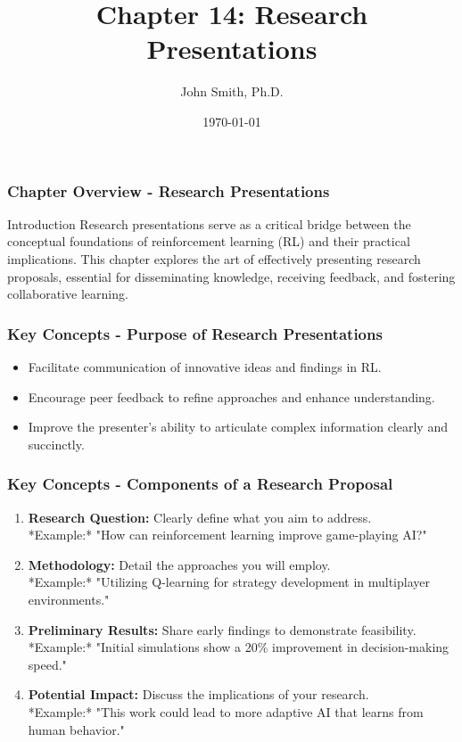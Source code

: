 \documentclass[aspectratio=169]{beamer}
\title[Research Presentations]{Chapter 14: Research Presentations}
\author[J. Smith]{John Smith, Ph.D.}
\institute[University Name]{
  Department of Computer Science\\
  University Name\\
  \vspace{0.3cm}
  Email: email@university.edu\\
  Website: www.university.edu
}
\date{\today}
\begin{document}
\frame{\titlepage}

\begin{frame}[fragile]
    \titlepage
\end{frame}

\begin{frame}[fragile]
    \frametitle{Chapter Overview - Research Presentations}
    \begin{block}{Introduction}
        Research presentations serve as a critical bridge between the conceptual foundations of reinforcement learning (RL) and their practical implications.
        This chapter explores the art of effectively presenting research proposals, essential for disseminating knowledge, receiving feedback, and fostering collaborative learning.
    \end{block}
\end{frame}

\begin{frame}[fragile]
    \frametitle{Key Concepts - Purpose of Research Presentations}
    \begin{itemize}
        \item Facilitate communication of innovative ideas and findings in RL.
        \item Encourage peer feedback to refine approaches and enhance understanding.
        \item Improve the presenter’s ability to articulate complex information clearly and succinctly.
    \end{itemize}
\end{frame}

\begin{frame}[fragile]
    \frametitle{Key Concepts - Components of a Research Proposal}
    \begin{enumerate}
        \item \textbf{Research Question:} Clearly define what you aim to address. \\
        *Example:* "How can reinforcement learning improve game-playing AI?"
        
        \item \textbf{Methodology:} Detail the approaches you will employ. \\
        *Example:* "Utilizing Q-learning for strategy development in multiplayer environments."
        
        \item \textbf{Preliminary Results:} Share early findings to demonstrate feasibility. \\
        *Example:* "Initial simulations show a 20\% improvement in decision-making speed."
        
        \item \textbf{Potential Impact:} Discuss the implications of your research. \\
        *Example:* "This work could lead to more adaptive AI that learns from human behavior."
    \end{enumerate}
\end{frame}
\end{document}
